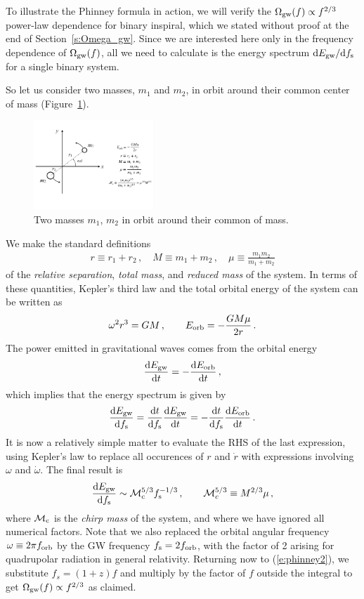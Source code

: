 \documentclass[11pt]{article}
\numberwithin{equation}{section}
\def\be{\begin{equation}}
\def\ee{\end{equation}}
\def\D{{\rm d}}
\begin{document}
To illustrate the Phinney formula in action, we will 
verify the $\Omega_{\rm gw}(f)\propto f^{2/3}$
power-law dependence for binary inspiral, which we
stated without proof at the end of Section~\ref{s:Omega_gw}.
Since we are interested here only in the frequency 
dependence of $\Omega_{\rm gw}(f)$, all we need to 
calculate is the energy spectrum $\D E_{\rm gw}/\D f_{\rm s}$
for a single binary system.

So let us consider two masses, $m_1$ and $m_2$, in orbit 
around their common center of mass (Figure~\ref{f:binary_inspiral}).
%
\begin{figure}[htbp!]
\begin{center}
\includegraphics[width=0.4\textwidth]{Figures/binary_inspiral}
\caption{Two masses $m_1$, $m_2$ in orbit around their common
of mass.}
\label{f:binary_inspiral}
\end{center}
\end{figure}
%
We make the standard definitions
%
\be
\begin{aligned}
r\equiv r_1+r_2\,,\quad
M\equiv m_1 + m_2\,,\quad
\mu\equiv \frac{m_1 m_2}{m_1 + m_2}
\end{aligned}
\ee
%
of the {\em relative separation}, {\em total mass}, 
and {\em reduced mass} of the system.
In terms of these quantities, Kepler's third law and 
the total orbital energy of the system can be written as
\be
\omega^2 r^3 = GM\,,\qquad
E_{\rm orb} = -\frac{GM\mu}{2r}\,.
\ee
%
The power emitted in gravitational waves comes from
the orbital energy
%
\be
\frac{\D E_{\rm gw}}{\D t} 
= -\frac{\D E_{\rm orb}}{\D t}\,,
\ee
%
which implies that the energy spectrum is given by
%
\be
\frac{\D E_{\rm gw}}{\D f_{\rm s}} 
= \frac{\D t}{\D f_{\rm s}}\frac{\D E_{\rm gw}}{\D t}
= -\frac{\D t}{\D f_{\rm s}}\frac{\D E_{\rm orb}}{\D t}\,.
\ee
%
It is now a relatively simple matter to evaluate the
RHS of the last expression, using Kepler's law to 
replace all occurences of $r$ and $\dot r$ with 
expressions involving $\omega$ and $\dot\omega$.
The final result is 
%
\be
\frac{\D E_{\rm gw}}{\D f_{\rm s}} 
\sim {\cal M}_{\rm c}^{5/3} f_{\rm s}^{-1/3}\,,
\qquad
{\cal M}_c^{5/3} \equiv M^{2/3}\mu\,,
\ee
%
where ${\cal M}_{\rm c}$ is the {\em chirp mass} of 
the system, and where we have ignored all numerical
factors.
Note that we also replaced the orbital angular frequency
$\omega\equiv 2\pi f_{\rm orb}$ by the GW frequency
$f_{\rm s} = 2 f_{\rm orb}$, with the factor of 2 
arising for quadrupolar radiation in general relativity.
Returning now to (\ref{e:phinney2}), we substitute
$f_s=(1+z)f$ and multiply by the factor of $f$ outside 
the integral to get
$\Omega_{\rm gw}(f) \propto f^{2/3}$ as claimed.
\end{document}
